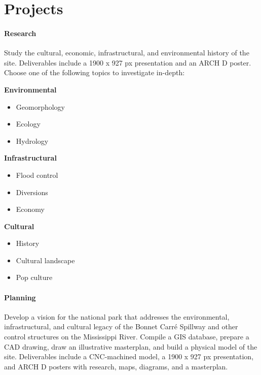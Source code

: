 \documentclass[11pt,article,oneside]{memoir}
\begin{document}
\section{Projects}

\paragraph{Research}
Study the cultural, economic, infrastructural, and environmental history of the site.
Deliverables include a 1900 x 927 px presentation
and an ARCH D poster. 
Choose one of the following topics to investigate in-depth:
\\

\noindent
\begin{minipage}[t]{0.32\linewidth}
\textbf{Environmental}
\begin{itemize}[label=\raisebox{0.2ex}{\small$\bullet$}]
\item Geomorphology
\item Ecology
\item Hydrology
\end{itemize}
\end{minipage}
\hfill
\begin{minipage}[t]{0.32\linewidth}
\textbf{Infrastructural}
\begin{itemize}[label=\raisebox{0.2ex}{\small$\bullet$}]
\item Flood control
\item Diversions
\item Economy
\end{itemize}
\end{minipage}
\hfill
\begin{minipage}[t]{0.32\linewidth}
\textbf{Cultural}
\begin{itemize}[label=\raisebox{0.2ex}{\small$\bullet$}]
\item History
\item Cultural landscape
\item Pop culture
\end{itemize}
\end{minipage}
 
\paragraph{Planning}
Develop a vision for the national park
that addresses the environmental, infrastructural, and cultural legacy
of the Bonnet Carré Spillway and other control structures on the Mississippi River.
Compile a GIS database, 
prepare a CAD drawing,
draw an illustrative masterplan, 
and build a physical model of the site.
Deliverables include 
a CNC-machined model, 
a 1900 x 927 px presentation,
and ARCH D posters
with research, maps, diagrams, and a masterplan. 
\end{document}
